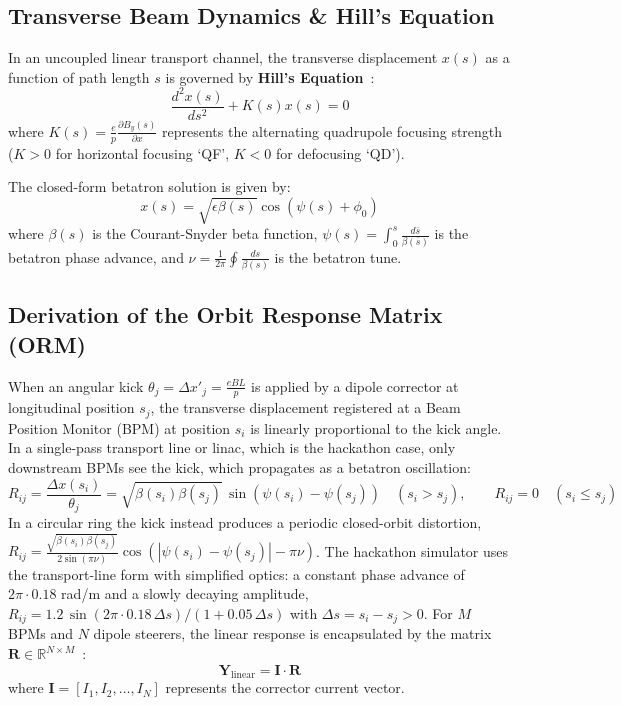 \documentclass[11pt,a4paper]{article}
\begin{document}
\subsection{Transverse Beam Dynamics \& Hill's Equation}
In an uncoupled linear transport channel, the transverse displacement $x(s)$ as a function of path length $s$ is governed by \textbf{Hill's Equation}~\cite{wiedemann2015particle}:
\begin{equation}
    \frac{d^2 x(s)}{ds^2} + K(s) x(s) = 0
\end{equation}
where $K(s) = \frac{e}{p} \frac{\partial B_y(s)}{\partial x}$ represents the alternating quadrupole focusing strength ($K > 0$ for horizontal focusing `QF', $K < 0$ for defocusing `QD').

The closed-form betatron solution is given by:
\begin{equation}
    x(s) = \sqrt{\epsilon \beta(s)} \cos\left( \psi(s) + \phi_0 \right)
\end{equation}
where $\beta(s)$ is the Courant-Snyder beta function, $\psi(s) = \int_0^s \frac{d\bar{s}}{\beta(\bar{s})}$ is the betatron phase advance, and $\nu = \frac{1}{2\pi} \oint \frac{ds}{\beta(s)}$ is the betatron tune.

\subsection{Derivation of the Orbit Response Matrix (ORM)}
When an angular kick $\theta_j = \Delta x'_j = \frac{e B L}{p}$ is applied by a dipole corrector at longitudinal position $s_j$, the transverse displacement registered at a Beam Position Monitor (BPM) at position $s_i$ is linearly proportional to the kick angle. In a single-pass transport line or linac, which is the hackathon case, only downstream BPMs see the kick, which propagates as a betatron oscillation:
\begin{equation}
    R_{ij} = \frac{\Delta x(s_i)}{\theta_j} = \sqrt{\beta(s_i)\beta(s_j)}\, \sin\left( \psi(s_i) - \psi(s_j) \right) \quad (s_i > s_j), \qquad R_{ij} = 0 \quad (s_i \le s_j)
\end{equation}
In a circular ring the kick instead produces a periodic closed-orbit distortion, $R_{ij} = \frac{\sqrt{\beta(s_i)\beta(s_j)}}{2 \sin(\pi \nu)} \cos\left( |\psi(s_i) - \psi(s_j)| - \pi \nu \right)$. The hackathon simulator uses the transport-line form with simplified optics: a constant phase advance of $2\pi \cdot 0.18$ rad/m and a slowly decaying amplitude, $R_{ij} = 1.2\,\sin(2\pi \cdot 0.18\,\Delta s)/(1 + 0.05\,\Delta s)$ with $\Delta s = s_i - s_j > 0$.
For $M$ BPMs and $N$ dipole steerers, the linear response is encapsulated by the matrix $\mathbf{R} \in \mathbb{R}^{N \times M}$~\cite{minty2003measurement}:
\begin{equation}
    \mathbf{Y}_{\text{linear}} = \mathbf{I} \cdot \mathbf{R}
\end{equation}
where $\mathbf{I} = [I_1, I_2, \dots, I_N]$ represents the corrector current vector.
\end{document}
